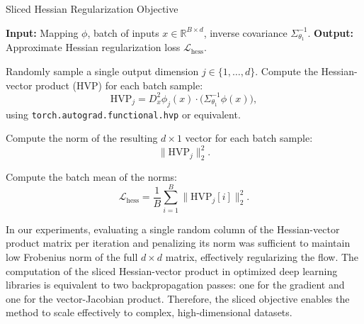 \begin{algorithm}
    \caption{Sliced Hessian Regularization Objective}
    \label{alg:sliced_hvp}
    \begin{algorithmic}[1]
        \STATE \textbf{Input:} Mapping \(\phi\), batch of inputs \(x \in \mathbb{R}^{B \times d}\), inverse covariance \(\Sigma_{\theta_1}^{-1}\).
        \STATE \textbf{Output:} Approximate Hessian regularization loss \(\mathcal{L}_{\text{hess}}\).

        \STATE Randomly sample a single output dimension \(j \in \{1, \dots, d\}\).
        \STATE Compute the Hessian-vector product (HVP) for each batch sample:
        \[
        \text{HVP}_j = D^2_x \phi_j(x) \cdot \bigl(\Sigma_{\theta_1}^{-1} \phi(x)\bigr),
        \]
        using \texttt{torch.autograd.functional.hvp} or equivalent.

        \STATE Compute the norm of the resulting \(d \times 1\) vector for each batch sample:
        \[
        \bigl\|\text{HVP}_j\bigr\|_2^2.
        \]

        \STATE Compute the batch mean of the norms:
        \[
        \mathcal{L}_{\text{hess}} = \frac{1}{B} \sum_{i=1}^B \bigl\|\text{HVP}_j[i]\bigr\|_2^2.
        \]
    \end{algorithmic}
\end{algorithm}

In our experiments, evaluating a single random column of the Hessian-vector product matrix per iteration and penalizing its norm was sufficient to maintain low Frobenius norm of the full \(d \times d\) matrix, effectively regularizing the flow. The computation of the sliced Hessian-vector product in optimized deep learning libraries is equivalent to two backpropagation passes: one for the gradient and one for the vector-Jacobian product. Therefore, the sliced objective enables the method to scale effectively to complex, high-dimensional datasets.

